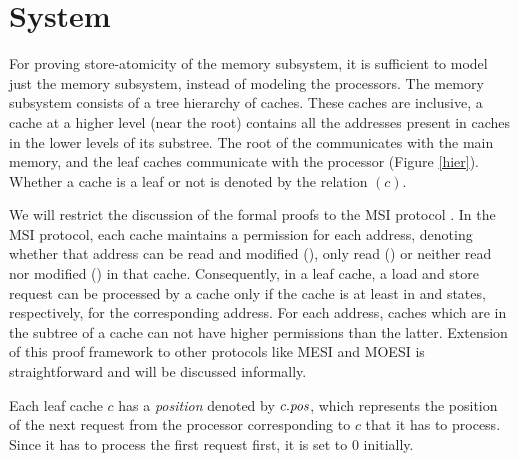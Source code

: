 \section{System}
\label{sec:System}

For proving store-atomicity of the memory subsystem, it is sufficient to model
just the memory subsystem, instead of modeling the processors.
The memory subsystem consists of a tree hierarchy of caches. These
caches are inclusive, \ie a cache at a higher level (near the root) contains
all the addresses present in caches in the lower levels of its substree. The
root of the communicates with the main memory, and the leaf caches communicate
with the processor (Figure \ref{hier}). Whether a cache is a leaf or not is
denoted by the relation \leaf$(c)$.

We will restrict the discussion of the formal proofs to the MSI protocol
\cite{MSI}. In the MSI protocol, each cache maintains a permission for each
address, denoting whether that address can be read and modified (\Mo), only
read (\Sh) or neither read nor modified (\In) in that cache. Consequently, in a
leaf cache, a load and store request can be processed by a cache only if the
cache is at least in \Sh{} and \Mo{} states, respectively, for the corresponding
address. For each address, caches which are in the subtree of a cache can not
have higher permissions than the latter. Extension of this proof framework to
other protocols like MESI and MOESI is straightforward and will be discussed
informally.

Each leaf cache $c$ has a \emph{position} denoted by $c.\textit{pos}$, which represents
the position of the next request from the processor corresponding to $c$ that
it has to process. Since it has to process the first request first, it is set
to $0$ initially.

